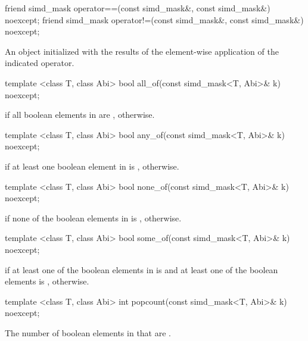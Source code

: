 \begin{itemdecl}
friend simd_mask operator==(const simd_mask&, const simd_mask&) noexcept;
friend simd_mask operator!=(const simd_mask&, const simd_mask&) noexcept;
\end{itemdecl}
\begin{itemdescr}
  \pnum\returns An object initialized with the results of the element-wise application of the indicated operator.
\end{itemdescr}

\begin{itemdecl}
template <class T, class Abi> bool  all_of(const simd_mask<T, Abi>& k) noexcept;
\end{itemdecl}
\begin{itemdescr}
  \pnum\returns \true if all boolean elements in  are \true, \false otherwise.
\end{itemdescr}

\begin{itemdecl}
template <class T, class Abi> bool  any_of(const simd_mask<T, Abi>& k) noexcept;
\end{itemdecl}
\begin{itemdescr}
  \pnum\returns \true if at least one boolean element in  is \true, \false otherwise.
\end{itemdescr}

\begin{itemdecl}
template <class T, class Abi> bool none_of(const simd_mask<T, Abi>& k) noexcept;
\end{itemdecl}
\begin{itemdescr}
  \pnum\returns \true if none of the boolean elements in  is \true, \false otherwise.
\end{itemdescr}

\begin{itemdecl}
template <class T, class Abi> bool some_of(const simd_mask<T, Abi>& k) noexcept;
\end{itemdecl}
\begin{itemdescr}
  \pnum\returns \true if at least one of the boolean elements in  is \true and at least one of the boolean elements  is \false, \false otherwise.
\end{itemdescr}

\begin{itemdecl}
template <class T, class Abi> int popcount(const simd_mask<T, Abi>& k) noexcept;
\end{itemdecl}
\begin{itemdescr}
  \pnum\returns The number of boolean elements in  that are \true.
\end{itemdescr}

